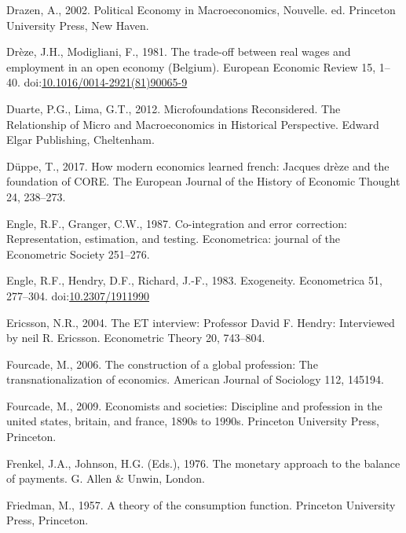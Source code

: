 \documentclass[
  12pt,
  onecolumn]{article}
\newlength{\cslhangindent}
\newlength{\cslentryspacingunit} %
\newenvironment{CSLReferences}[2] %
 {%
  \setlength{\parindent}{0pt}
  \ifodd #1
  \let\oldpar\par
  \def\par{\hangindent=\cslhangindent\oldpar}
  \fi
  \setlength{\parskip}{#2\cslentryspacingunit}
 }%
 {}
\begin{document}
\begin{CSLReferences}{1}{0}
\leavevmode{}%
Drazen, A., 2002. Political {Economy} in {Macroeconomics}, Nouvelle. ed.
{Princeton University Press}, {New Haven}.

\leavevmode{}%
Drèze, J.H., Modigliani, F., 1981. The trade-off between real wages and
employment in an open economy ({Belgium}). European Economic Review 15,
1--40.
doi:\href{https://doi.org/10.1016/0014-2921(81)90065-9}{10.1016/0014-2921(81)90065-9}

\leavevmode{}%
Duarte, P.G., Lima, G.T., 2012. Microfoundations {Reconsidered}. {The
Relationship} of {Micro} and {Macroeconomics} in {Historical
Perspective}. {Edward Elgar Publishing}, {Cheltenham}.

\leavevmode{}%
Düppe, T., 2017. How modern economics learned french: Jacques drèze and
the foundation of CORE. The European Journal of the History of Economic
Thought 24, 238--273.

\leavevmode{}%
Engle, R.F., Granger, C.W., 1987. Co-integration and error correction:
Representation, estimation, and testing. Econometrica: journal of the
Econometric Society 251--276.

\leavevmode{}%
Engle, R.F., Hendry, D.F., Richard, J.-F., 1983. Exogeneity.
Econometrica 51, 277--304.
doi:\href{https://doi.org/10.2307/1911990}{10.2307/1911990}

\leavevmode{}%
Ericsson, N.R., 2004. The {ET} interview: {Professor David F}. {Hendry}:
{Interviewed} by neil {R}. {Ericsson}. Econometric Theory 20, 743--804.

\leavevmode{}%
Fourcade, M., 2006. The construction of a global profession: The
transnationalization of economics. American Journal of Sociology 112,
145194.

\leavevmode{}%
Fourcade, M., 2009. Economists and societies: Discipline and profession
in the united states, britain, and france, 1890s to 1990s. Princeton
University Press, Princeton.

\leavevmode{}%
Frenkel, J.A., Johnson, H.G. (Eds.), 1976. The monetary approach to the
balance of payments. {G. Allen \& Unwin}, {London}.

\leavevmode{}%
Friedman, M., 1957. A theory of the consumption function. Princeton
University Press, Princeton.


\end{CSLReferences}
\end{document}
